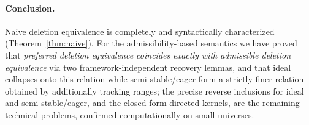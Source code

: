 \documentclass{amsart}
\theoremstyle{remark}
\begin{document}
\paragraph{Conclusion.}  Naive deletion equivalence is completely and
syntactically characterized (Theorem~\ref{thm:naive}).  For the
admissibility-based semantics we have proved that \emph{preferred deletion
equivalence coincides exactly with admissible deletion equivalence} via two
framework-independent recovery lemmas, and that ideal collapses onto this
relation while semi-stable/eager form a strictly finer relation obtained by
additionally tracking ranges; the precise reverse inclusions for ideal and
semi-stable/eager, and the closed-form directed kernels, are the remaining
technical problems, confirmed computationally on small universes.
\end{document}
